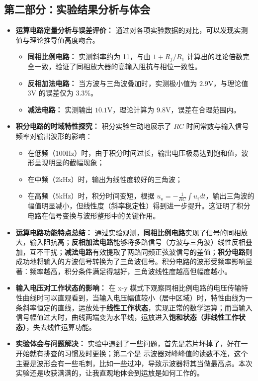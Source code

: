 \documentclass[10.5pt]{config}
\begin{document}
\subsection*{第二部分：实验结果分析与体会}
\begin{itemize}[leftmargin=2em]

        \item \textbf{运算电路定量分析与误差评价：}
        通过对各项实验数据的对比，可以发现实测值与理论推导值高度吻合。
        \begin{itemize}
            \item \textbf{同相比例电路：} 实测斜率约为 11，与由 $1+R_f/R_1$ 计算出的理论倍数完全一致，验证了同相放大器的高输入阻抗与相位一致性。
            \item \textbf{反相加法电路：} 当方波与三角波叠加时，实测极小值为 $2.9\text{V}$，与理论值 $3\text{V}$ 的误差仅为 3.3\%。
            \item \textbf{减法电路：} 实测输出 $10.1\text{V}$，理论计算为 $9.8\text{V}$，误差在合理范围内。
        \end{itemize}
    
        \item \textbf{积分电路的时域特性探究：}
        积分实验生动地展示了 $RC$ 时间常数与输入信号频率对输出波形的影响：
        \begin{itemize}
            \item 在低频（$100\mathrm{Hz}$）时，由于积分时间过长，输出电压极易达到饱和值，波形呈现明显的截幅现象；
            \item 在中频（$2\mathrm{kHz}$）时，输出为线性度较好的三角波；
            \item 在高频（$5\mathrm{kHz}$）时，积分时间变短，根据 $u_o = -\frac{1}{RC}\int u_i dt$，输出三角波的幅值明显减小，但线性度（斜率稳定性）得到进一步提升。这证明了积分电路在信号变换与波形整形中的关键作用。
        \end{itemize}


    \item \textbf{运算电路功能特点总结：}
    通过实验观测，\textbf{同相比例电路}实现了信号的同相放大，输入阻抗高；\textbf{反相加法电路}能够将多路信号（方波与三角波）线性反相叠加，互不干扰；\textbf{减法电路}有效提取了两路同频正弦波信号的差值；\textbf{积分电路}则成功地将输入的方波信号转换为了三角波信号。积分电路的波形受频率影响显著：频率越高，积分条件满足得越好，三角波线性度越高但幅度越小。
    
    \item \textbf{输入电压对工作状态的影响：}
    在 x-y 模式下观察同相比例电路的电压传输特性曲线时可以直观看到，当输入电压幅值较小（居中区域）时，特性曲线为一条斜率恒定的直线，运放处于\textbf{线性工作状态}，实现正常的数学运算；而当输入信号幅值过大时，曲线两端变为水平线，运放进入\textbf{饱和状态（非线性工作状态）}，失去线性运算功能。
    
    \item \textbf{实验体会与问题解决：}
    实验中遇到了一些问题，首先是芯片坏掉了，好在一开始就有排查的习惯及时更换；第二个是 示波器对峰峰值的读数不准，这个主要是波形会有一些毛刺，比如一些过冲，导致示波器将其当做最高点。本次实验还是收获满满的，让我直观地体会到运放是如何工作的。

\end{itemize}
\end{document}
